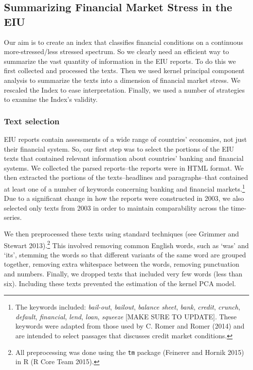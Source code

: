 \documentclass[]{article}
\let\rmarkdownfootnote\footnote%
\def\footnote{\protect\rmarkdownfootnote}
\begin{document}
\subsection{Summarizing Financial Market Stress in the
EIU}\label{summarizing-financial-market-stress-in-the-eiu}

Our aim is to create an index that classifies financial conditions on a
continuous more-stressed/less stressed spectrum. So we clearly need an
efficient way to summarize the vast quantity of information in the EIU
reports. To do this we first collected and processed the texts. Then we
used kernel principal component analysis to summarize the texts into a
dimension of financial market stress. We rescaled the Index to ease
interpretation. Finally, we used a number of strategies to examine the
Index's validity.

\subsubsection{Text selection}\label{text-selection}

EIU reports contain assessments of a wide range of countries' economies,
not just their financial system. So, our first step was to select the
portions of the EIU texts that contained relevant information about
countries' banking and financial systems. We collected the parsed
reports--the reports were in HTML format. We then extracted the portions
of the texts--headlines and paragraphs--that contained at least one of a
number of keywords concerning banking and financial markets.\footnote{The
  keywords included: \emph{bail-out}, \emph{bailout}, \emph{balance
  sheet}, \emph{bank}, \emph{credit}, \emph{crunch}, \emph{default},
  \emph{financial}, \emph{lend}, \emph{loan}, \emph{squeeze} {[}MAKE
  SURE TO UPDATE{]}. These keywords were adapted from those used by C.
  Romer and Romer (2014) and are intended to select passages that
  discusses credit market conditions.} Due to a significant change in
how the reports were constructed in 2003, we also selected only texts
from 2003 in order to maintain comparability across the time-series.

We then preprocessed these texts using standard techniques (see Grimmer
and Stewart 2013).\footnote{All preprocessing was done using the
  \texttt{tm} package (Feinerer and Hornik 2015) in R (R Core Team
  2015).} This involved removing common English words, such as `was' and
`its', stemming the words so that different variants of the same word
are grouped together, removing extra whitespace between the words,
removing punctuation and numbers. Finally, we dropped texts that
included very few words (less than six). Including these texts prevented
the estimation of the kernel PCA model.
\end{document}
